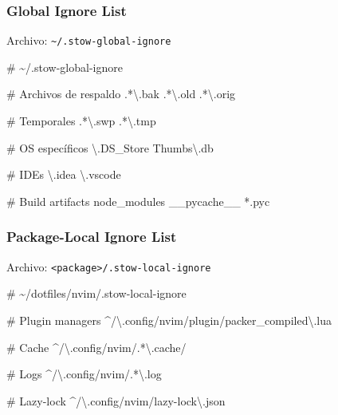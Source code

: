 \documentclass[
  doc,
  floatsintext,
  longtable,
  a4paper,
  nolmodern,
  notxfonts,
  notimes,
  12pt,
  colorlinks=true,linkcolor=blue,citecolor=blue,urlcolor=blue]{apa7}
\newenvironment{Shaded}{\begin{snugshade}}{\end{snugshade}}
\newcommand{\BuiltInTok}[1]{\textcolor[rgb]{0.00,0.23,0.31}{#1}}
\newcommand{\CommentTok}[1]{\textcolor[rgb]{0.37,0.37,0.37}{#1}}
\newcommand{\DataTypeTok}[1]{\textcolor[rgb]{0.68,0.00,0.00}{#1}}
\newcommand{\ExtensionTok}[1]{\textcolor[rgb]{0.00,0.23,0.31}{#1}}
\newcommand{\NormalTok}[1]{\textcolor[rgb]{0.00,0.23,0.31}{#1}}
\newcommand{\PreprocessorTok}[1]{\textcolor[rgb]{0.68,0.00,0.00}{#1}}
\begin{document}
\subsubsection{Global Ignore List}\label{global-ignore-list}

Archivo: \texttt{\textasciitilde{}/.stow-global-ignore}

\begin{Shaded}
\begin{Highlighting}[]
\CommentTok{\# \textasciitilde{}/.stow{-}global{-}ignore}

\CommentTok{\# Archivos de respaldo}
\BuiltInTok{.}\PreprocessorTok{*}\DataTypeTok{\textbackslash{}.}\NormalTok{bak}
\BuiltInTok{.}\PreprocessorTok{*}\DataTypeTok{\textbackslash{}.}\NormalTok{old}
\BuiltInTok{.}\PreprocessorTok{*}\DataTypeTok{\textbackslash{}.}\NormalTok{orig}

\CommentTok{\# Temporales}
\BuiltInTok{.}\PreprocessorTok{*}\DataTypeTok{\textbackslash{}.}\NormalTok{swp}
\BuiltInTok{.}\PreprocessorTok{*}\DataTypeTok{\textbackslash{}.}\NormalTok{tmp}

\CommentTok{\# OS específicos}
\ExtensionTok{\textbackslash{}.DS\_Store}
\ExtensionTok{Thumbs\textbackslash{}.db}

\CommentTok{\# IDEs}
\ExtensionTok{\textbackslash{}.idea}
\ExtensionTok{\textbackslash{}.vscode}

\CommentTok{\# Build artifacts}
\ExtensionTok{node\_modules}
\ExtensionTok{\_\_pycache\_\_}
\ExtensionTok{*.pyc}
\end{Highlighting}
\end{Shaded}

\subsubsection{Package-Local Ignore
List}\label{package-local-ignore-list}

Archivo: \texttt{\textless{}package\textgreater{}/.stow-local-ignore}

\begin{Shaded}
\begin{Highlighting}[]
\CommentTok{\# \textasciitilde{}/dotfiles/nvim/.stow{-}local{-}ignore}

\CommentTok{\# Plugin managers}
\ExtensionTok{\^{}/\textbackslash{}.config/nvim/plugin/packer\_compiled\textbackslash{}.lua}

\CommentTok{\# Cache}
\ExtensionTok{\^{}/\textbackslash{}.config/nvim/.*\textbackslash{}.cache/}

\CommentTok{\# Logs}
\ExtensionTok{\^{}/\textbackslash{}.config/nvim/.*\textbackslash{}.log}

\CommentTok{\# Lazy{-}lock}
\ExtensionTok{\^{}/\textbackslash{}.config/nvim/lazy{-}lock\textbackslash{}.json}
\end{Highlighting}
\end{Shaded}
\end{document}
